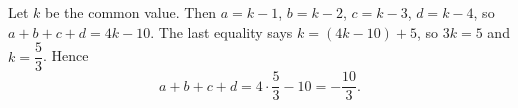 Let $k$ be the common value. Then $a=k-1$, $b=k-2$, $c=k-3$, $d=k-4$, so $a+b+c+d=4k-10$. The last equality says $k=(4k-10)+5$, so $3k=5$ and $k=\dfrac{5}{3}$. Hence
\[a+b+c+d=4\cdot\dfrac{5}{3}-10=\boxed{-\dfrac{10}{3}}.\]
